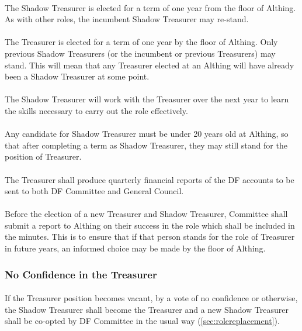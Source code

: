 \documentclass[a4paper, 11pt]{report}
\begin{document}
\paragraph{}
The Shadow Treasurer is elected for a term of one year from the floor of Althing. As with other roles, the incumbent Shadow Treasurer may re-stand.
\paragraph{}
The Treasurer is elected for a term of one year by the floor of Althing. Only previous Shadow Treasurers (or the incumbent or previous Treasurers) may stand.  This will mean that any Treasurer elected at an Althing will have already been a Shadow Treasurer at some point.
\paragraph{}
The Shadow Treasurer will work with the Treasurer over the next year to learn the skills necessary to carry out the role effectively.
\paragraph{}
Any candidate for Shadow Treasurer must be under 20 years old at Althing, so that after completing a term as Shadow Treasurer, they may still stand for the position of Treasurer.
\paragraph{}
The Treasurer shall produce quarterly financial reports of the DF accounts to be sent to both DF Committee and General Council.
\paragraph{}
\label{sec:treasurerreport}
Before the election of a new Treasurer and Shadow Treasurer, Committee shall submit a report to Althing on their success in the role which shall be included in the minutes. This is to ensure that if that person stands for the role of Treasurer in future years, an informed choice may be made by the floor of Althing.
\subsubsection{No Confidence in the Treasurer}
\label{sec:treasurernoconfidence}
\paragraph{} If the Treasurer position becomes vacant, by a vote of no confidence or otherwise, the Shadow Treasurer shall become the Treasurer and a new Shadow Treasurer shall be co-opted by DF Committee in the usual way (\ref{sec:rolereplacement}).
\end{document}
